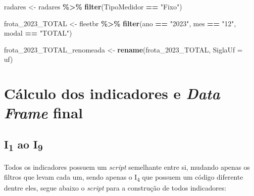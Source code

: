\documentclass[
]{book}
\newenvironment{Shaded}{\begin{snugshade}}{\end{snugshade}}
\newcommand{\AttributeTok}[1]{\textcolor[rgb]{0.13,0.29,0.53}{#1}}
\newcommand{\FunctionTok}[1]{\textcolor[rgb]{0.13,0.29,0.53}{\textbf{#1}}}
\newcommand{\NormalTok}[1]{#1}
\newcommand{\OtherTok}[1]{\textcolor[rgb]{0.56,0.35,0.01}{#1}}
\newcommand{\SpecialCharTok}[1]{\textcolor[rgb]{0.81,0.36,0.00}{\textbf{#1}}}
\newcommand{\StringTok}[1]{\textcolor[rgb]{0.31,0.60,0.02}{#1}}
\begin{document}
\begin{Shaded}
\begin{Highlighting}[]
\NormalTok{radares }\OtherTok{\textless{}{-}}\NormalTok{ radares }\SpecialCharTok{\%\textgreater{}\%} 
  \FunctionTok{filter}\NormalTok{(TipoMedidor }\SpecialCharTok{==} \StringTok{"Fixo"}\NormalTok{)}


\NormalTok{frota\_2023\_TOTAL }\OtherTok{\textless{}{-}}\NormalTok{ fleetbr }\SpecialCharTok{\%\textgreater{}\%} 
  \FunctionTok{filter}\NormalTok{(ano }\SpecialCharTok{==} \StringTok{"2023"}\NormalTok{,}
\NormalTok{         mes }\SpecialCharTok{==} \StringTok{"12"}\NormalTok{,}
\NormalTok{         modal }\SpecialCharTok{==} \StringTok{"TOTAL"}\NormalTok{)}

\NormalTok{frota\_2023\_TOTAL\_renomeada }\OtherTok{\textless{}{-}} \FunctionTok{rename}\NormalTok{(frota\_2023\_TOTAL, }\AttributeTok{SiglaUf =}\NormalTok{ uf)}
\end{Highlighting}
\end{Shaded}

\section{\texorpdfstring{Cálculo dos indicadores e \emph{Data Frame} final}{Cálculo dos indicadores e Data Frame final}}\label{cuxe1lculo-dos-indicadores-e-data-frame-final}

\subsection{\texorpdfstring{I\textsubscript{1} ao I\textsubscript{9}}{I1 ao I9}}\label{i1-ao-i9}

Todos os indicadores possuem um \emph{script} semelhante entre si, mudando apenas os filtros que levam cada um, sendo apenas o I\textsubscript{4} que possuem um código diferente dentre eles, segue abaixo o \emph{script} para a construção de todos indicadores:
\end{document}
